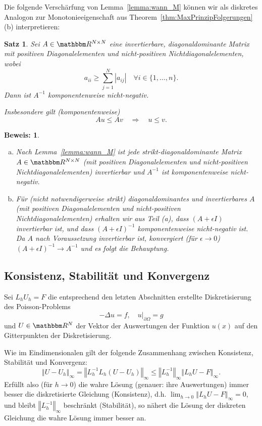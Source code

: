 \documentclass[12pt,a4paper]{book}
\theoremstyle{break}
\newtheorem{theorem}{Satz}[chapter]
\theoremstyle{nonumberplain}
\newtheorem{beweis}{Beweis:}
\newcommand{\R}{\mathbbm R}
\newcommand{\norm}[1]{\left\Vert#1\right\Vert}		%
\newcommand{\1}{\mathbbm{1}} 			      	%
\begin{document}
Die folgende Verschärfung von Lemma~\ref{lemma:wann_M}
können wir als diskretes Analogon zur 
Monotonieeigenschaft aus Theorem~\ref{thm:MaxPrinzipFolgerungen}(b) interpretieren:
\begin{theorem}
Sei $A\in \R^{N\times N}$ eine invertierbare, diagonaldominante Matrix mit positiven Diagonalelementen und nicht-positiven Nichtdiagonalelementen,
wobei
\[
a_{ii}\geq \sum_{j=1}^N |a_{ij}| \quad \forall i\in \{1,\ldots,n\}. 
\]
Dann ist $A^{-1}$ komponentenweise nicht-negativ.

Insbesondere gilt (komponentenweise)
\[
A u\leq A v \quad \Longrightarrow \quad u\leq v.
\]
\end{theorem}
\begin{beweis}
\begin{enumerate}[(a)]
\item Nach Lemma~\ref{lemma:wann_M} ist jede strikt-diagonaldominante Matrix $A\in \R^{N\times N}$
(mit positiven Diagonalelementen und nicht-positiven Nichtdiagonalelementen) invertierbar 
und $A^{-1}$ ist komponentenweise nicht-negativ.
%
\item Für (nicht notwendigerweise strikt) diagonaldominantes und invertierbares $A$ (mit positiven Diagonalelementen und nicht-positiven Nichtdiagonalelementen) erhalten wir aus Teil (a),
dass $(A+\epsilon I)$ invertierbar ist, und dass $(A+\epsilon I)^{-1}$ komponentenweise nicht-negativ ist. Da $A$ nach Voraussetzung invertierbar ist, konvergiert (für $\epsilon\to 0$) $(A+\epsilon I)^{-1}\to A^{-1}$ und es folgt die Behauptung.
\end{enumerate}
\end{beweis}

\subsection{Konsistenz, Stabilität und Konvergenz}

Sei $L_h U_h=F$ die entsprechend den letzten Abschnitten erstellte Diskretisierung des Poisson-Problems
\[
-\Delta u=f, \quad u|_{\partial \Omega}=g
\]
und $U\in \R^N$ der Vektor der Auswertungen der Funktion $u(x)$ auf den Gitterpunkten der Diskretisierung.

Wie im Eindimensionalen gilt der folgende Zusammenhang zwischen Konsistenz, Stabilität und Konvergenz:
\[
\norm{U-U_h}_\infty = \norm{L_h^{-1} L_h (U-U_h)}_\infty\leq \norm{L_h^{-1}}_\infty \norm{L_h U - F}_\infty.
\]
Erfüllt also (für $h\to 0$) die wahre Lösung (genauer: ihre Auswertungen) immer besser die diskretisierte Gleichung (Konsistenz),
d.h. $\lim_{h\to 0} \norm{L_h U - F}_\infty=0$, und bleibt $\norm{L_h^{-1}}_\infty$ beschränkt (Stabilität), so nähert die
Lösung der diskreten Gleichung die wahre Lösung immer besser an.
\end{document}
